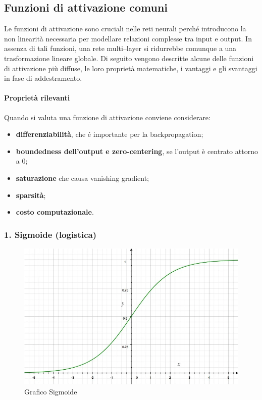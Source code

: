 \documentclass[a4paper,12pt]{report}
\begin{document}
	\subsection{Funzioni di attivazione comuni}
	
	Le funzioni di attivazione sono cruciali nelle reti neurali perché introducono la non linearità necessaria per modellare relazioni complesse tra input e output. In assenza di tali funzioni, una rete multi–layer si ridurrebbe comunque a una trasformazione lineare globale. Di seguito vengono descritte alcune delle funzioni di attivazione più diffuse, le loro proprietà matematiche, i vantaggi e gli svantaggi in fase di addestramento.
	
	\paragraph{Proprietà rilevanti}
	Quando si valuta una funzione di attivazione conviene considerare:
	\begin{itemize}
		\item \textbf{differenziabilità}, che é importante per la backpropagation;
		\item \textbf{boundedness dell'output e zero-centering}, se l'output è centrato attorno a 0;
		\item \textbf{saturazione} che causa vanishing gradient;
		\item \textbf{sparsità};
		\item \textbf{costo computazionale}.
	\end{itemize}
	
	\subsubsection{1. Sigmoide (logistica)}
	
	\begin{figure}[H]
		\centering
		\includegraphics[width=1.0\textwidth]{img/sigmoid.png}
		\caption{Grafico Sigmoide}
	\end{figure}
	
\end{document}
